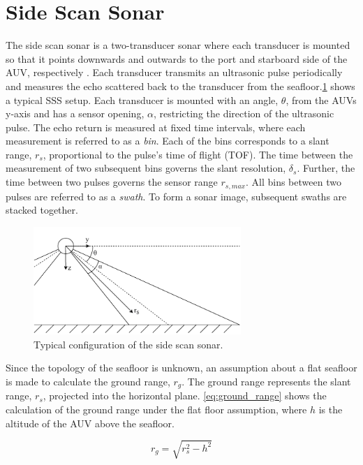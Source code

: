 \section{Side Scan Sonar}

The side scan sonar is a two-transducer sonar where each transducer is mounted so that it points downwards and outwards to the port and starboard side of the AUV, respectively \cite{Burguera2016High-ResolutionSonar}. Each transducer transmits an ultrasonic pulse periodically and measures the echo scattered back to the transducer from the seafloor.\cref{fig:sss} shows a typical SSS setup. Each transducer is mounted with an angle, $\theta$, from the AUVs y-axis and has a sensor opening, $\alpha$, restricting the direction of the ultrasonic pulse. The echo return is measured at fixed time intervals, where each measurement is referred to as a \textit{bin}. Each of the bins corresponds to a slant range, $r_s$, proportional to the pulse's time of flight (TOF). The time between the measurement of two subsequent bins governs the slant resolution, $\delta_s$. Further, the time between two pulses governs the sensor range $r_{s,max}$. All bins between two pulses are referred to as a \textit{swath}. To form a sonar image, subsequent swaths are stacked together.

\begin{figure}
    \centering
    \includegraphics[width=0.7\textwidth]{figures/sss.drawio.pdf}
    \caption{Typical configuration of the side scan sonar.}
    \label{fig:sss}
\end{figure}

Since the topology of the seafloor is unknown, an assumption about a flat seafloor is made to calculate the ground range, $r_g$. The ground range represents the slant range, $r_s$, projected into the horizontal plane. \cref{eq:ground_range} shows the calculation of the ground range under the flat floor assumption, where $h$ is the altitude of the AUV above the seafloor.

\begin{equation}
    r_g = \sqrt{r_s^2 - h^2}
    \label{eq:ground_range}
\end{equation}

